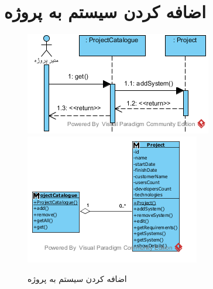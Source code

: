 \section{اضافه کردن سیستم به پروژه}
\begin{figure}[H]
	\centering
	\includegraphics[scale=0.7]{img/sequence-analysis/AddSystemToProject}
	\includegraphics[scale=0.7]{img/sequence-analysis/AddSystemToProjectC}
	\caption{اضافه کردن سیستم به پروژه}
\end{figure}

